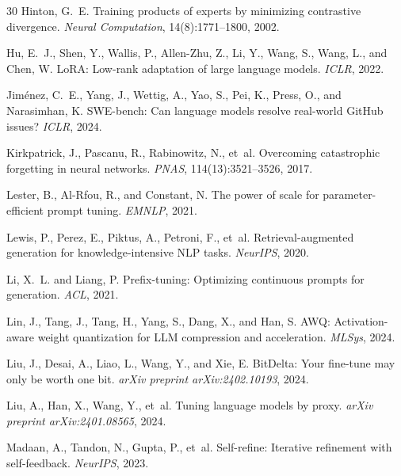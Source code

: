 \begin{thebibliography}{30}
Hinton, G.~E.
\newblock Training products of experts by minimizing contrastive divergence.
\newblock \emph{Neural Computation}, 14(8):1771--1800, 2002.

Hu, E.~J., Shen, Y., Wallis, P., Allen-Zhu, Z., Li, Y., Wang, S., Wang, L.,
  and Chen, W.
\newblock LoRA: Low-rank adaptation of large language models.
\newblock \emph{ICLR}, 2022.

Jim{\'e}nez, C.~E., Yang, J., Wettig, A., Yao, S., Pei, K., Press, O., and
  Narasimhan, K.
\newblock SWE-bench: Can language models resolve real-world {GitHub} issues?
\newblock \emph{ICLR}, 2024.

Kirkpatrick, J., Pascanu, R., Rabinowitz, N., et~al.
\newblock Overcoming catastrophic forgetting in neural networks.
\newblock \emph{PNAS}, 114(13):3521--3526, 2017.

Lester, B., Al-Rfou, R., and Constant, N.
\newblock The power of scale for parameter-efficient prompt tuning.
\newblock \emph{EMNLP}, 2021.

Lewis, P., Perez, E., Piktus, A., Petroni, F., et~al.
\newblock Retrieval-augmented generation for knowledge-intensive NLP tasks.
\newblock \emph{NeurIPS}, 2020.

Li, X.~L. and Liang, P.
\newblock Prefix-tuning: Optimizing continuous prompts for generation.
\newblock \emph{ACL}, 2021.

Lin, J., Tang, J., Tang, H., Yang, S., Dang, X., and Han, S.
\newblock AWQ: Activation-aware weight quantization for LLM compression and
  acceleration.
\newblock \emph{MLSys}, 2024.

Liu, J., Desai, A., Liao, L., Wang, Y., and Xie, E.
\newblock BitDelta: Your fine-tune may only be worth one bit.
\newblock \emph{arXiv preprint arXiv:2402.10193}, 2024.

Liu, A., Han, X., Wang, Y., et~al.
\newblock Tuning language models by proxy.
\newblock \emph{arXiv preprint arXiv:2401.08565}, 2024.

Madaan, A., Tandon, N., Gupta, P., et~al.
\newblock Self-refine: Iterative refinement with self-feedback.
\newblock \emph{NeurIPS}, 2023.


\end{thebibliography}
